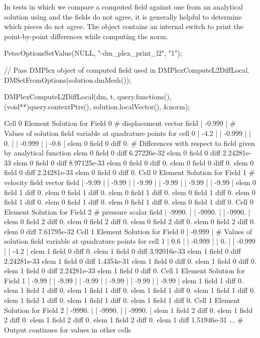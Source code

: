 In tests in which we compare a computed field against one from an analytical solution using
 and the fields do not agree, it is generally helpful to determine which pieces do
not agree. The  object contains an internal switch to print the point-by-point differences while computing
the norm.

\begin{cplusplus}
PetscOptionsSetValue(NULL, "-dm_plex_print_l2", "1");

// Pass DMPlex object of computed field used in DMPlexComputeL2DiffLocal.
DMSetFromOptions(solution.dmMesh());

DMPlexComputeL2DiffLocal(dm, t, query.functions(), (void**)query.contextPtrs(), solution.localVector(), &norm);
\end{cplusplus}

\begin{shell}
Cell 0 Element Solution for Field 0 # displacement vector field
  | -0.999 | # Values of solution field variable at quadrature points for cell 0
  | -4.2 |
  | -0.999 |
  | 0. |
  | -0.999 |
  | -0.6 |
    elem 0 field 0 diff 0.           # Differences with respect to field given by analytical function
    elem 0 field 0 diff 6.27226e-32
    elem 0 field 0 diff 2.24281e-33
    elem 0 field 0 diff 8.97125e-33
    elem 0 field 0 diff 0.
    elem 0 field 0 diff 0.
    elem 0 field 0 diff 2.24281e-33
    elem 0 field 0 diff 0.
Cell 0 Element Solution for Field 1 # velocity field vector field
  | -9.99 |
  | -9.99 |
  | -9.99 |
  | -9.99 |
  | -9.99 |
  | -9.99 |
    elem 0 field 1 diff 0.
    elem 0 field 1 diff 0.
    elem 0 field 1 diff 0.
    elem 0 field 1 diff 0.
    elem 0 field 1 diff 0.
    elem 0 field 1 diff 0.
    elem 0 field 1 diff 0.
    elem 0 field 1 diff 0.
Cell 0 Element Solution for Field 2 # pressure scalar field
  | -9990. |
  | -9990. |
  | -9990. |
    elem 0 field 2 diff 0.
    elem 0 field 2 diff 0.
    elem 0 field 2 diff 0.
    elem 0 field 2 diff 0.
  elem 0 diff 7.61795e-32
Cell 1 Element Solution for Field 0
  | -0.999 | # Values of solution field variable at quadrature points for cell 1
  | 0.6 |
  | -0.999 |
  | 0. |
  | -0.999 |
  | -4.2 |
    elem 1 field 0 diff 0.
    elem 1 field 0 diff 3.92016e-33
    elem 1 field 0 diff 2.24281e-33
    elem 1 field 0 diff 1.4354e-31
    elem 1 field 0 diff 0.
    elem 1 field 0 diff 0.
    elem 1 field 0 diff 2.24281e-33
    elem 1 field 0 diff 0.
Cell 1 Element Solution for Field 1
  | -9.99 |
  | -9.99 |
  | -9.99 |
  | -9.99 |
  | -9.99 |
  | -9.99 |
    elem 1 field 1 diff 0.
    elem 1 field 1 diff 0.
    elem 1 field 1 diff 0.
    elem 1 field 1 diff 0.
    elem 1 field 1 diff 0.
    elem 1 field 1 diff 0.
    elem 1 field 1 diff 0.
    elem 1 field 1 diff 0.
Cell 1 Element Solution for Field 2
  | -9990. |
  | -9990. |
  | -9990. |
    elem 1 field 2 diff 0.
    elem 1 field 2 diff 0.
    elem 1 field 2 diff 0.
    elem 1 field 2 diff 0.
  elem 1 diff 1.51946e-31
... # Output continues for values in other cells
\end{shell}


